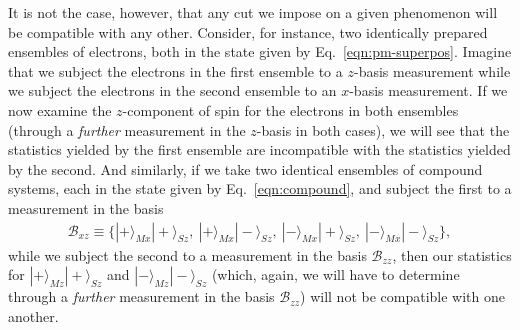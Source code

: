 It is not the case, however, that any cut we impose on a given phenomenon will be compatible with any other. Consider, for instance, two identically prepared ensembles of electrons, both in the state given by Eq.\ \eqref{eqn:pm-superpos}. Imagine that we subject the electrons in the first ensemble to a $z$-basis measurement while we subject the electrons in the second ensemble to an $x$-basis measurement. If we now examine the $z$-component of spin for the electrons in both ensembles (through a \emph{further} measurement in the $z$-basis in both cases), we will see that the statistics yielded by the first ensemble are incompatible with the statistics yielded by the second. And similarly, if we take two identical ensembles of compound systems, each in the state given by Eq.\ \eqref{eqn:compound}, and subject the first to a measurement in the basis
\begin{align}
  \label{eqn:xzbasis}
  \mathcal{B}_{xz} \equiv \{|+\rangle_{Mx}|+\rangle_{Sz},~ |+\rangle_{Mx}|-\rangle_{Sz},~ |-\rangle_{Mx}|+\rangle_{Sz},~ |-\rangle_{Mx}|-\rangle_{Sz}\},
\end{align}
while we subject the second to a measurement in the basis $\mathcal{B}_{zz}$, then our statistics for $| + \rangle_{Mz}| + \rangle_{Sz}$ and $| - \rangle_{Mz}| - \rangle_{Sz}$ (which, again, we will have to determine through a \emph{further} measurement in the basis $\mathcal{B}_{zz}$) will not be compatible with one another.

